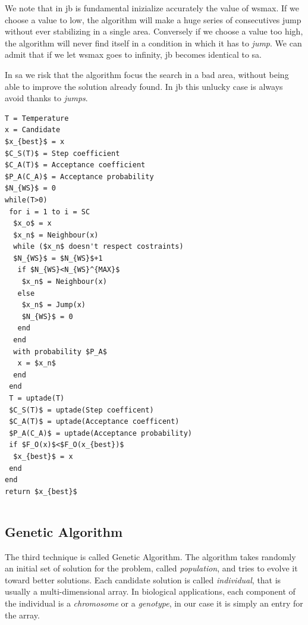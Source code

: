 \documentclass[journal]{IEEEtran}
\begin{document}
We note that in \gls{jb} is fundamental inizialize accurately the value of \gls{wsmax}. If we choose a value to low, the algorithm will make a huge series of consecutives jump without ever stabilizing in a single area. Conversely if we choose a value too high, the algorithm will never find itself in a condition in which it has to \textit{jump}. We can admit that if we let \gls{wsmax} goes to infinity, \gls{jb} becomes identical to \gls{sa}.

In \gls{sa} we risk that the algorithm focus the search in a bad area, without being able to improve the solution already found. In \gls{jb} this unlucky case is always avoid thanks to \textit{jumps}.


\pagebreak

\begin{lstlisting}[mathescape=true,frame=single]
T = Temperature
x = Candidate
$x_{best}$ = x
$C_S(T)$ = Step coefficient
$C_A(T)$ = Acceptance coefficient
$P_A(C_A)$ = Acceptance probability
$N_{WS}$ = 0
while(T>0)
 for i = 1 to i = SC
  $x_o$ = x
  $x_n$ = Neighbour(x)
  while ($x_n$ doesn't respect costraints)
  $N_{WS}$ = $N_{WS}$+1
   if $N_{WS}<N_{WS}^{MAX}$
    $x_n$ = Neighbour(x)
   else
    $x_n$ = Jump(x)
    $N_{WS}$ = 0
   end
  end
  with probability $P_A$
   x = $x_n$
  end
 end
 T = uptade(T)
 $C_S(T)$ = uptade(Step coefficent)
 $C_A(T)$ = uptade(Acceptance coefficent)
 $P_A(C_A)$ = uptade(Acceptance probability)
 if $F_O(x)$<$F_O(x_{best})$
  $x_{best}$ = x
 end
end
return $x_{best}$
\end{lstlisting} 

\pagebreak

\begin{lstlisting}[frame=single]
\end{lstlisting} 


\subsection{Genetic Algorithm}
The third technique is called Genetic Algorithm.
The algorithm takes randomly an initial set of solution for the problem, called \textit{population}, and tries to evolve it toward better solutions.
Each candidate solution is called \textit{individual}, that is usually a multi-dimensional array. In biological applications, each component of the individual is a \textit{chromosome} or a \textit{genotype}, in our case it is simply an entry for the array.
\end{document}
